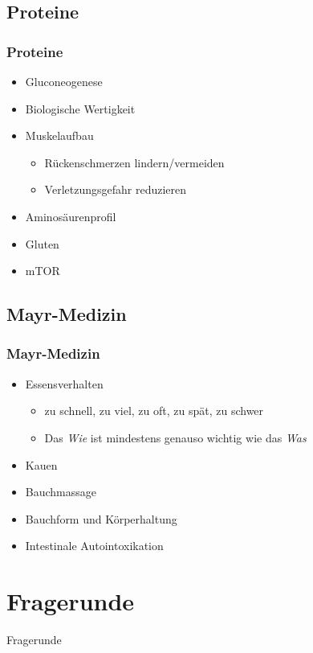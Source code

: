 \documentclass[xcolor=dvipsnames]{beamer}
\begin{document}
    \subsection{Proteine}
    \begin{frame}
        \frametitle{Proteine}
        \begin{itemize}
            \setlength\itemsep{1em}
            \item Gluconeogenese
            \item Biologische Wertigkeit
            \item Muskelaufbau
            \begin{itemize}
                \item Rückenschmerzen lindern/vermeiden
                \item Verletzungsgefahr reduzieren
            \end{itemize}
            \item Aminosäurenprofil
            \item Gluten
            \item mTOR
        \end{itemize}
    \end{frame}

    \subsection{Mayr-Medizin}
    \begin{frame}
        \frametitle{Mayr-Medizin}
        \begin{itemize}
            \setlength\itemsep{1em}
            \item Essensverhalten
            \begin{itemize}
                \item zu schnell, zu viel, zu oft, zu spät, zu schwer
            \end{itemize}
            \begin{itemize}
                \item Das \textit{Wie} ist mindestens genauso wichtig wie das \textit{Was}
            \end{itemize}
            \item Kauen
            \item Bauchmassage
            \item Bauchform und Körperhaltung
            \item Intestinale Autointoxikation
        \end{itemize}
    \end{frame}

    \section{Fragerunde}
    {
        \begin{frame}
            \begin{center}
                \Huge Fragerunde
            \end{center}
        \end{frame}
    }
\end{document}
